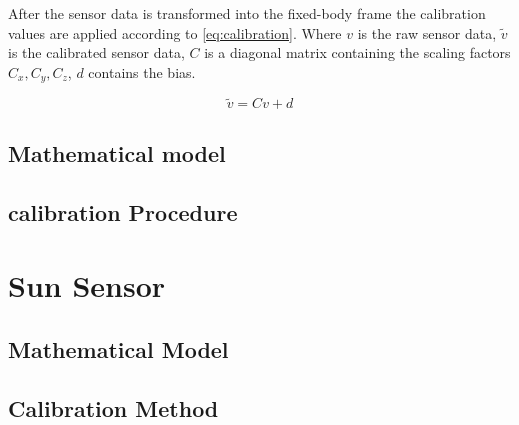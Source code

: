 After the sensor data is transformed into the fixed-body frame the calibration values are applied according to \autoref{eq:calibration}. Where $v$ is the raw sensor data, $\tilde{v}$ is the calibrated sensor data, $C$ is a diagonal matrix containing the scaling factors ${C_{x},C_{y},C_{z}}$, $d$ contains the bias.   

\begin{equation}\label{eq:calibration}
	\tilde{v} = Cv + d
\end{equation}     
\fi


\subsection{Mathematical model}
\subsection{calibration Procedure}


\section{Sun Sensor}
\subsection{Mathematical Model}
\subsection{Calibration Method}
